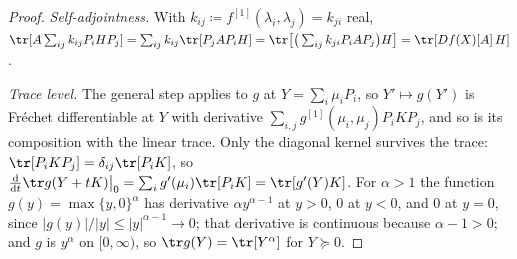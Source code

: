 \begin{proof}
\begin{sloppypar}
\emph{Self-adjointness.} With $k_{ij}\coloneqq
f^{[1]}(\lambda_i,\lambda_j)=k_{ji}$ real,
$\tr[A\sum_{ij}k_{ij}P_iHP_j]=\sum_{ij}k_{ij}\tr[P_jAP_iH]
=\tr\big[\big(\sum_{ij}k_{ji}P_iAP_j\big)H\big]
=\tr[Df(X)[A]\,H]$.

\emph{Trace level.} The general step applies to $g$ at $Y=\sum_i\mu_iP_i$,
so $Y'\mapsto g(Y')$ is Fr\'echet differentiable at $Y$ with derivative
$\sum_{i,j}g^{[1]}(\mu_i,\mu_j)P_iKP_j$, and so is its composition with the
linear trace. Only the diagonal kernel survives the trace:
$\tr[P_iKP_j]=\delta_{ij}\tr[P_iK]$, so
$\frac{\mathrm d}{\mathrm dt}\tr g(Y+tK)\big|_0
=\sum_ig'(\mu_i)\tr[P_iK]=\tr[g'(Y)K]$. For $\alpha>1$ the function
$g(y)=\max\{y,0\}^{\alpha}$ has derivative $\alpha y^{\alpha-1}$ at $y>0$,
$0$ at $y<0$, and $0$ at $y=0$, since $|g(y)|/|y|\le|y|^{\alpha-1}\to0$;
that derivative is continuous because $\alpha-1>0$; and $g$ is $y^{\alpha}$
on $[0,\infty)$, so $\tr g(Y)=\tr[Y^{\alpha}]$ for $Y\succeq0$.
\end{sloppypar}
\end{proof}
